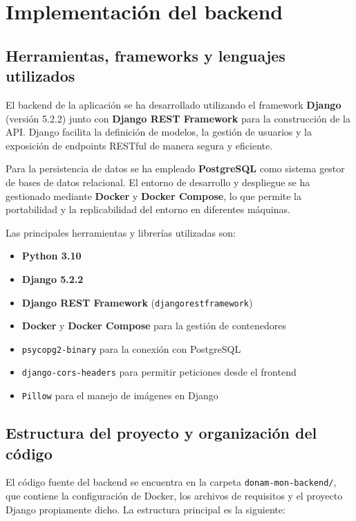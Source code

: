 \section{Implementación del backend}

\subsection{Herramientas, frameworks y lenguajes utilizados}

El backend de la aplicación se ha desarrollado utilizando el framework \textbf{Django} (versión 5.2.2) junto con \textbf{Django REST Framework} para la construcción de la API. Django facilita la definición de modelos, la gestión de usuarios y la exposición de endpoints RESTful de manera segura y eficiente.

Para la persistencia de datos se ha empleado \textbf{PostgreSQL} como sistema gestor de bases de datos relacional. El entorno de desarrollo y despliegue se ha gestionado mediante \textbf{Docker} y \textbf{Docker Compose}, lo que permite la portabilidad y la replicabilidad del entorno en diferentes máquinas.

Las principales herramientas y librerías utilizadas son:
\begin{itemize}
    \item \textbf{Python 3.10}
    \item \textbf{Django 5.2.2} 
    \item \textbf{Django REST Framework} (\texttt{djangorestframework})
    \item \textbf{Docker} y \textbf{Docker Compose} para la gestión de contenedores
    \item \texttt{psycopg2-binary} para la conexión con PostgreSQL
    \item \texttt{django-cors-headers} para permitir peticiones desde el frontend
    \item \texttt{Pillow} para el manejo de imágenes en Django
\end{itemize}
\subsection{Estructura del proyecto y organización del código}

El código fuente del backend se encuentra en la carpeta \texttt{donam-mon-backend/}, que contiene la configuración de Docker, los archivos de requisitos y el proyecto Django propiamente dicho. La estructura principal es la siguiente:

